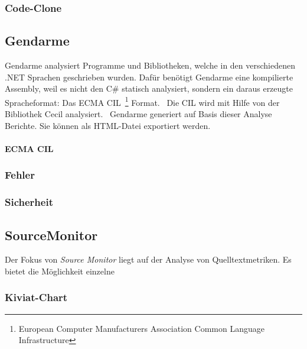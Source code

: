 \subsubsection{Code-Clone}


\subsection{Gendarme}
Gendarme analysiert Programme und Bibliotheken, welche in den verschiedenen .NET Sprachen geschrieben wurden. Dafür benötigt Gendarme eine kompilierte Assembly, weil es nicht den C\# statisch analysiert, sondern ein daraus erzeugte Spracheformat: Das ECMA CIL~\footnote{European Computer Manufacturers Association Common Language Infrastructure} Format.~\cite{ecma} Die CIL wird mit Hilfe von der Bibliothek Cecil analysiert.~\cite{cecil} Gendarme generiert auf Basis dieser Analyse Berichte. Sie können als HTML-Datei exportiert werden.

\paragraph{ECMA CIL}

\subsubsection{Fehler}

\subsubsection{Sicherheit}


\subsection{SourceMonitor}
Der Fokus von \emph{Source Monitor} liegt auf der Analyse von Quelltextmetriken. Es bietet die Möglichkeit einzelne 

\subsubsection{Kiviat-Chart}
